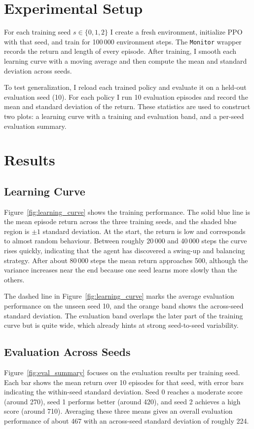 \documentclass[a4paper, twocolumn, 10pt]{article}
\begin{document}
\section{Experimental Setup}
For each training seed $s \in \{0,1,2\}$ I create a fresh environment, initialize PPO with that seed, and train for 100\,000 environment steps. The \texttt{Monitor} wrapper records the return and length of every episode. After training, I smooth each learning curve with a moving average and then compute the mean and standard deviation across seeds.

To test generalization, I reload each trained policy and evaluate it on a held-out evaluation seed (10). For each policy I run 10 evaluation episodes and record the mean and standard deviation of the return. These statistics are used to construct two plots: a learning curve with a training and evaluation band, and a per-seed evaluation summary.

\section{Results}

\subsection{Learning Curve}
Figure~\ref{fig:learning_curve} shows the training performance. The solid blue line is the mean episode return across the three training seeds, and the shaded blue region is $\pm 1$ standard deviation. At the start, the return is low and corresponds to almost random behaviour. Between roughly 20\,000 and 40\,000 steps the curve rises quickly, indicating that the agent has discovered a swing-up and balancing strategy. After about 80\,000 steps the mean return approaches 500, although the variance increases near the end because one seed learns more slowly than the others.

The dashed line in Figure~\ref{fig:learning_curve} marks the average evaluation performance on the unseen seed 10, and the orange band shows the across-seed standard deviation. The evaluation band overlaps the later part of the training curve but is quite wide, which already hints at strong seed-to-seed variability.

\subsection{Evaluation Across Seeds}
Figure~\ref{fig:eval_summary} focuses on the evaluation results per training seed. Each bar shows the mean return over 10 episodes for that seed, with error bars indicating the within-seed standard deviation. Seed 0 reaches a moderate score (around 270), seed 1 performs better (around 420), and seed 2 achieves a high score (around 710). Averaging these three means gives an overall evaluation performance of about 467 with an across-seed standard deviation of roughly 224.
\end{document}
